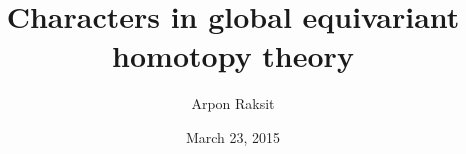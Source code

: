
\usepackage{tikz}
\usepackage{varwidth}

\title{Characters in global equivariant homotopy theory}
\author{Arpon Raksit}
\date{March 23, 2015}


\maketitle
\vspace{5ex}

\setcounter{tocdepth}{1}
\tableofcontents
\newpage


\newpage









\nocite{lurie-ambi}




